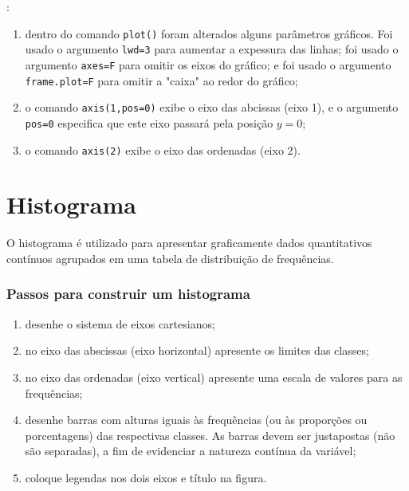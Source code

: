 \documentclass[11pt,fleqn]{book} %
\begin{document}
: 

\begin{enumerate}[label=\alph*)]

\item dentro do comando \texttt{plot()} foram alterados alguns parâmetros gráficos. Foi usado o argumento \texttt{lwd=3} para aumentar a expessura das linhas; foi usado o argumento \texttt{axes=F} para omitir os eixos do gráfico; e foi usado o argumento \texttt{frame.plot=F} para omitir a "caixa" ao redor do gráfico;

\item o comando \texttt{axis(1,pos=0)} exibe o eixo das abcissas (eixo 1), e o argumento \texttt{pos=0} especifica que este eixo passará pela posição $y=0$;

\item o comando \texttt{axis(2)} exibe o eixo das ordenadas (eixo 2).
 
\end{enumerate}





\section{Histograma}

O histograma é utilizado para apresentar graficamente dados quantitativos contínuos agrupados em uma tabela de distribuição de frequências.

\subsubsection{Passos para construir um histograma} 


\begin{enumerate}

\item desenhe o sistema de eixos cartesianos;

\item no eixo das abscissas (eixo horizontal) apresente os limites das classes;

\item no eixo das ordenadas (eixo vertical) apresente uma escala de valores para as frequências;

\item desenhe barras com alturas iguais às frequências (ou às proporções ou porcentagens) das respectivas classes. As barras devem ser justapostas (não são separadas), a fim de evidenciar a natureza contínua da variável;

\item coloque legendas nos dois eixos e título na figura. \\

\end{enumerate}
\end{document}
